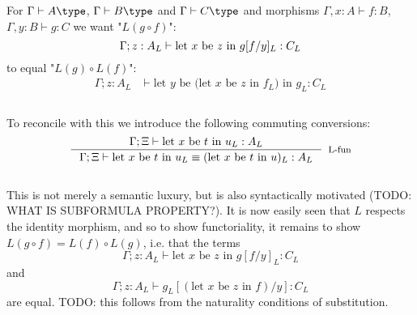 For $\Gamma \vdash A \type$, $\Gamma \vdash B \type$ and $\Gamma \vdash C \type$ and morphisms $\Gamma, x : A \vdash f : B$, $\Gamma, y : B \vdash g : C$ we want "$L(g \circ f)$":
\[
  \Gamma; z : A_L \vdash \text{let $x$ be $z$ in $g[f/y]_L$} : C_L\\
\]
to equal "$L(g) \circ L(f)$":
\[
  \begin{split}
    \Gamma; z : A_L &\vdash \text{let $y$ be (let $x$ be $z$ in $f_L$) in $g_L$} : C_L\\
  \end{split}
\]\\
To reconcile with this we introduce the following commuting conversions:
\[
\inference{\Gamma; \Xi \vdash \text{let $x$ be $t$ in $u_L$} : A_L}{\Gamma; \Xi \vdash \text{let $x$ be $t$ in $u_L$} \equiv (\text{let $x$ be $t$ in $u$})_L : A_L}[L-fun]
\]\\
This is not merely a semantic luxury, but is also syntactically motivated (TODO: WHAT IS SUBFORMULA PROPERTY?). It is now easily seen that $L$ respects the identity morphism, and so to show functoriality, it remains to show $L(g \circ f) = L(f) \circ L(g)$, i.e. that the terms
\[
  \Gamma; z : A_L \vdash \text{let $x$ be $z$ in }g[f/y]_L : C_L
\]
and
\[
  \Gamma; z : A_L \vdash g_L[(\text{let $x$ be $z$ in }f)/y] : C_L
\]
are equal. TODO: this follows from the naturality conditions of substitution.

